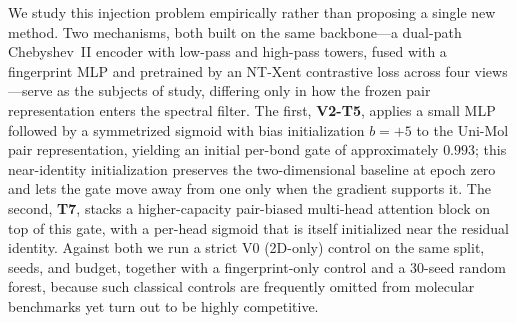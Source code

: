 \documentclass[sigconf,nonacm,anonymous,review]{acmart}
\begin{document}
We study this injection problem empirically rather than proposing a single new method. Two mechanisms, both built on the same backbone---a dual-path Chebyshev~II encoder with low-pass and high-pass towers, fused with a fingerprint MLP and pretrained by an NT-Xent contrastive loss across four views---serve as the subjects of study, differing only in how the frozen pair representation enters the spectral filter. The first, \textbf{V2-T5}, applies a small MLP followed by a symmetrized sigmoid with bias initialization $b{=}{+}5$ to the Uni-Mol pair representation, yielding an initial per-bond gate of approximately $0.993$; this near-identity initialization preserves the two-dimensional baseline at epoch zero and lets the gate move away from one only when the gradient supports it. The second, \textbf{T7}, stacks a higher-capacity pair-biased multi-head attention block on top of this gate, with a per-head sigmoid that is itself initialized near the residual identity. Against both we run a strict V0 (2D-only) control on the same split, seeds, and budget, together with a fingerprint-only control and a 30-seed random forest, because such classical controls are frequently omitted from molecular benchmarks yet turn out to be highly competitive.
\end{document}
